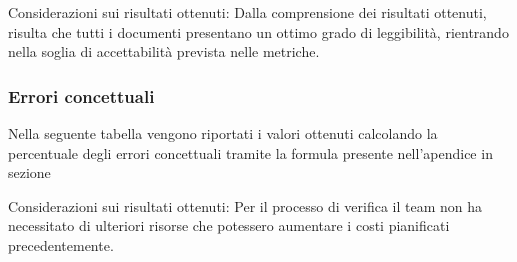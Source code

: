 	Considerazioni sui risultati ottenuti: Dalla comprensione dei risultati ottenuti, risulta che tutti i documenti presentano un ottimo grado di leggibilità, rientrando nella soglia di accettabilità prevista nelle metriche.

\subsubsection{Errori concettuali}

Nella seguente tabella vengono riportati i valori ottenuti calcolando la percentuale degli errori concettuali tramite la formula presente nell'apendice in sezione ~


Considerazioni sui risultati ottenuti: Per il processo di verifica il team non ha necessitato di ulteriori risorse che potessero aumentare i costi pianificati precedentemente.

